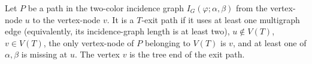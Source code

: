 \begin{definition}
Let $P$ be a path in the two-color incidence graph
$I_G(\varphi;\alpha,\beta)$ from the vertex-node $u$ to the vertex-node
$v$.  It is a $T$-exit path if it uses at least one multigraph edge
(equivalently, its incidence-graph length is at least two), $u\notin V(T)$,
$v\in V(T)$, the only vertex-node of $P$ belonging to $V(T)$ is $v$, and
at least one of $\alpha,\beta$ is missing at $u$.  The vertex $v$ is the
tree end of the exit path.
\end{definition}
